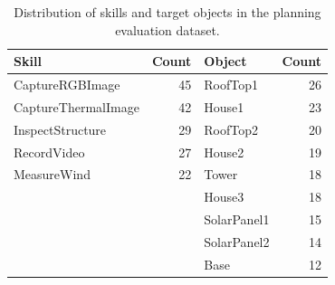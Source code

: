 \begin{table}[htbp]
\centering
\caption{Distribution of skills and target objects in the planning evaluation dataset.}
\label{tab:planning_dataset_distribution}
\begin{tabular}{lrlr}
\toprule
Skill & Count & Object & Count \\
\midrule
CaptureRGBImage     & 45 & RoofTop1    & 26 \\
CaptureThermalImage & 42 & House1      & 23 \\
InspectStructure    & 29 & RoofTop2    & 20 \\
RecordVideo         & 27 & House2      & 19 \\
MeasureWind         & 22 & Tower       & 18 \\
                    &    & House3      & 18 \\
                    &    & SolarPanel1 & 15 \\
                    &    & SolarPanel2 & 14 \\
                    &    & Base        & 12 \\
\bottomrule
\end{tabular}
\end{table}